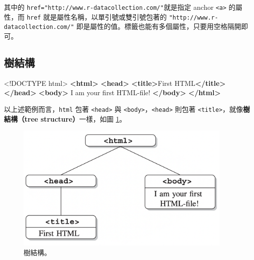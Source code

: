 \documentclass[
]{book}
\newenvironment{Shaded}{\begin{snugshade}}{\end{snugshade}}
\newcommand{\DataTypeTok}[1]{\textcolor[rgb]{0.13,0.29,0.53}{#1}}
\newcommand{\KeywordTok}[1]{\textcolor[rgb]{0.13,0.29,0.53}{\textbf{#1}}}
\newcommand{\NormalTok}[1]{#1}
\theoremstyle{definition}
\theoremstyle{remark}
\begin{document}
其中的 \texttt{href="http://www.r-datacollection.com/"}就是指定 anchor \texttt{\textless{}a\textgreater{}} 的屬性，而 \texttt{href} 就是屬性名稱，以單引號或雙引號包著的 \texttt{"http://www.r-datacollection.com/"} 即是屬性的值。標籤也能有多個屬性，只要用空格隔開即可。

\hypertarget{ux6a39ux7d50ux69cb}{%
\subsection{樹結構}\label{ux6a39ux7d50ux69cb}}

\begin{Shaded}
\begin{Highlighting}[]
\DataTypeTok{\textless{}!DOCTYPE }\NormalTok{html}\DataTypeTok{\textgreater{}}
 \KeywordTok{\textless{}html\textgreater{}}
   \KeywordTok{\textless{}head\textgreater{}}
     \KeywordTok{\textless{}title\textgreater{}}\NormalTok{First HTML}\KeywordTok{\textless{}/title\textgreater{}}
   \KeywordTok{\textless{}/head\textgreater{}}
   \KeywordTok{\textless{}body\textgreater{}}
\NormalTok{     I am your first HTML{-}file!}
   \KeywordTok{\textless{}/body\textgreater{}}
 \KeywordTok{\textless{}/html\textgreater{}}
\end{Highlighting}
\end{Shaded}

以上述範例而言，\texttt{html} 包著 \texttt{\textless{}head\textgreater{}} 與 \texttt{\textless{}body\textgreater{}}，\texttt{\textless{}head\textgreater{}} 則包著 \texttt{\textless{}title\textgreater{}}，就像\textbf{樹結構（tree structure）}一樣，如圖 \ref{fig:treestructure}。

\begin{figure}

{\centering \includegraphics[width=400]{images/截圖 2021-07-28 下午5.31.14} 

}

\caption{樹結構。}\label{fig:treestructure}
\end{figure}
\end{document}
